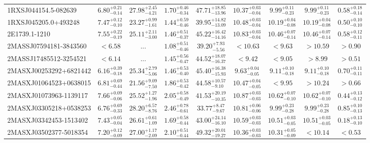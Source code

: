 \documentclass[onecolumn]{mn2e}
\begin{document}
{\begin{center}
\begin{longtable}{lcccccccc}
\hline \hline
\endfoot
1RXSJ044154.5-082639 & $6.80_{-0.14}^{+0.21}$ & $27.98_{-4.21}^{+2.45}$ & $1.70_{-0.34}^{+0.46}$ &$47.71_{-13.96}^{+18.85}$ & $10.37_{-0.04}^{+0.03}$ & $9.99_{-0.23}^{+0.11}$ & $9.99_{-0.23}^{+0.11}$ & $0.58_{-0.14}^{+0.18}$ \\
1RXSJ045205.0+493248 & $7.47_{-0.10}^{+0.12}$ & $23.27_{-1.61}^{+0.99}$ & $1.44_{-0.46}^{+0.59}$ &$39.95_{-13.09}^{+14.82}$ & $10.48_{-0.04}^{+0.03}$ & $10.19_{-0.08}^{+0.04}$ & $10.19_{-0.08}^{+0.04}$ & $0.50_{-0.10}^{+0.10}$ \\
2E1739.1-1210 & $7.55_{-0.19}^{+0.22}$ & $25.11_{-3.00}^{+2.11}$ & $1.46_{-0.37}^{+0.51}$ &$45.22_{-14.16}^{+16.42}$ & $10.83_{-0.04}^{+0.03}$ & $10.46_{-0.14}^{+0.07}$ & $10.46_{-0.14}^{+0.07}$ & $0.58_{-0.11}^{+0.12}$ \\
2MASSJ07594181-3843560 & $<6.58$ & ... & $1.08_{-0.46}^{+0.51}$ &$39.20_{-5.56}^{+7.93}$ & $<10.63$ & $<9.63$ & $>10.59$ & $>0.90$ \\
2MASSJ17485512-3254521 & $<6.14$ & ... & $1.45_{-0.47}^{+0.56}$ &$44.52_{-16.37}^{+18.07}$ & $<9.42$ & $<9.05$ & $>8.99$ & $>0.51$ \\
2MASXJ00253292+6821442 & $6.16_{-0.18}^{+0.39}$ & $25.34_{-5.06}^{+2.79}$ & $1.46_{-0.40}^{+0.53}$ &$45.40_{-15.93}^{+16.38}$ & $9.63_{-0.05}^{+0.04}$ & $9.11_{-0.18}^{+0.10}$ & $9.11_{-0.18}^{+0.10}$ & $0.70_{-0.11}^{+0.11}$ \\
2MASXJ01064523+0638015 & $6.81_{-0.44}^{+0.69}$ & $21.56_{-7.50}^{+9.09}$ & $1.86_{-0.42}^{+0.53}$ &$44.58_{-9.10}^{+10.57}$ & $10.47_{-0.05}^{+0.04}$ & $<9.95$ & $>10.24$ & $>0.66$ \\
2MASXJ01073963-1139117 & $7.66_{-0.06}^{+0.09}$ & $25.52_{-1.96}^{+1.27}$ & $2.05_{-0.49}^{+0.58}$ &$41.53_{-10.35}^{+20.19}$ & $10.87_{-0.03}^{+0.03}$ & $10.62_{-0.10}^{+0.07}$ & $10.62_{-0.10}^{+0.07}$ & $0.44_{-0.12}^{+0.13}$ \\
2MASXJ03305218+0538253 & $6.76_{-0.33}^{+0.69}$ & $28.20_{-8.76}^{+6.57}$ & $2.46_{-0.61}^{+0.78}$ &$33.77_{-9.67}^{+8.47}$ & $10.81_{-0.06}^{+0.06}$ & $9.99_{-0.28}^{+0.23}$ & $9.99_{-0.28}^{+0.23}$ & $0.85_{-0.13}^{+0.10}$ \\
2MASXJ03342453-1513402 & $7.43_{-0.04}^{+0.05}$ & $26.61_{-1.09}^{+0.61}$ & $1.69_{-0.44}^{+0.58}$ &$43.00_{-16.10}^{+24.14}$ & $10.59_{-0.03}^{+0.03}$ & $10.51_{-0.05}^{+0.03}$ & $10.51_{-0.05}^{+0.03}$ & $0.18_{-0.10}^{+0.13}$ \\
2MASXJ03502377-5018354 & $7.20_{-0.09}^{+0.12}$ & $27.00_{-2.09}^{+1.17}$ & $2.10_{-0.44}^{+0.51}$ &$49.32_{-19.27}^{+20.01}$ & $10.36_{-0.03}^{+0.03}$ & $10.31_{-0.09}^{+0.05}$ & $<10.14$ & $<0.53$ \\

\end{longtable}
\end{center}}
\end{document}
